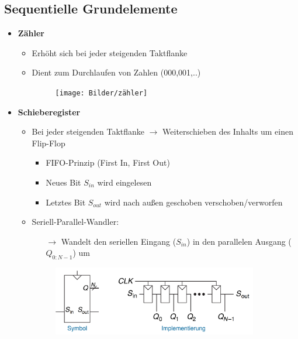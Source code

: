 \documentclass[11pt,a4paper]{article}
\begin{document}
\subsection{Sequentielle Grundelemente}
\begin{itemize}

\item \textbf{Zähler}
	\begin{itemize}
	\item Erhöht sich bei jeder steigenden Taktflanke
	\item Dient zum Durchlaufen von Zahlen (000,001,..)
	\item[]
		\begin{figure}[H]
		\begin{center}
		\texttt{[image: Bilder/zähler]}
		\end{center}
		\end{figure}
	\end{itemize}
	
\item \textbf{Schieberegister}
	\begin{itemize}
	\item Bei jeder steigenden Taktflanke $\rightarrow$ Weiterschieben des Inhalts um einen Flip-Flop
		\begin{itemize}
		\item FIFO-Prinzip (First In, First Out)
		\item Neues Bit $S_{in}$ wird eingelesen
		\item Letztes Bit $S_{out}$ wird nach außen geschoben verschoben/verworfen
		\end{itemize}
	\item Seriell-Parallel-Wandler: 
		\begin{itemize}
		\item[$\rightarrow$] Wandelt den seriellen Eingang ($S_{in}$) in den parallelen Ausgang ($Q_{0:N-1}$) um
		\end{itemize}
		
	\item[]
		\begin{figure}[H]
		\begin{center}
		\includegraphics[height=3cm]{Bilder/schieberegister}
		\end{center}
		\end{figure}
	\end{itemize}


\end{itemize}
\end{document}
